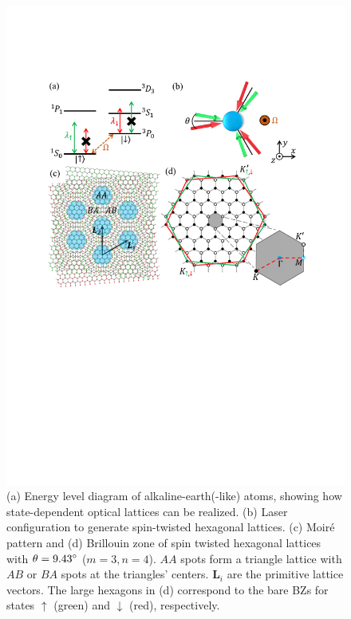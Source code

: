 \documentclass[twocolumn,english,prl,floatfix,citeautoscript,nofootinbib]{revtex4}
\begin{document}
\begin{figure}[tb]
\includegraphics[width=1.0\linewidth]{figure1.pdf}
\caption{(a) Energy level diagram of alkaline-earth(-like) atoms, showing
how state-dependent optical lattices can be realized. (b) Laser
configuration to generate spin-twisted hexagonal lattices. (c) Moir\'{e}
pattern and (d) Brillouin zone of spin twisted hexagonal lattices with $%
\protect\theta =9.43^{\circ }$ ($m=3,n=4$). $AA$ spots form a triangle
lattice with $AB$ or $BA$ spots at the triangles' centers. $\mathbf{L}_{i}$
are the primitive lattice vectors. The large hexagons in (d) correspond to
the bare BZs for states $\uparrow $ (green) and $\downarrow $ (red),
respectively. }
\label{fig:sys}
\end{figure}
\end{document}
